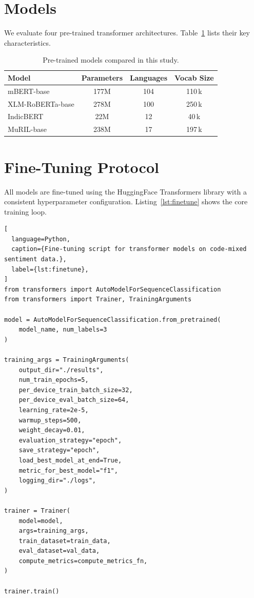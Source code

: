 \documentclass[12pt,a4paper]{report}
\begin{document}
\section{Models}

We evaluate four pre-trained transformer architectures. Table~\ref{tab:models} lists their key characteristics.

\begin{table}[htbp]
\centering
\caption{Pre-trained models compared in this study.}
\label{tab:models}
\begin{tabular}{@{}lccc@{}}
\toprule
\textbf{Model}    & \textbf{Parameters} & \textbf{Languages} & \textbf{Vocab Size} \\
\midrule
mBERT-base        & 177M & 104 & 110\,k \\
XLM-RoBERTa-base  & 278M & 100 & 250\,k \\
IndicBERT         &  22M &  12 &  40\,k \\
MuRIL-base        & 238M &  17 & 197\,k \\
\bottomrule
\end{tabular}
\end{table}

\section{Fine-Tuning Protocol}

All models are fine-tuned using the HuggingFace Transformers library with a consistent hyperparameter configuration. Listing~\ref{lst:finetune} shows the core training loop.

\begin{lstlisting}[
  language=Python,
  caption={Fine-tuning script for transformer models on code-mixed sentiment data.},
  label={lst:finetune},
]
from transformers import AutoModelForSequenceClassification
from transformers import Trainer, TrainingArguments

model = AutoModelForSequenceClassification.from_pretrained(
    model_name, num_labels=3
)

training_args = TrainingArguments(
    output_dir="./results",
    num_train_epochs=5,
    per_device_train_batch_size=32,
    per_device_eval_batch_size=64,
    learning_rate=2e-5,
    warmup_steps=500,
    weight_decay=0.01,
    evaluation_strategy="epoch",
    save_strategy="epoch",
    load_best_model_at_end=True,
    metric_for_best_model="f1",
    logging_dir="./logs",
)

trainer = Trainer(
    model=model,
    args=training_args,
    train_dataset=train_data,
    eval_dataset=val_data,
    compute_metrics=compute_metrics_fn,
)

trainer.train()
\end{lstlisting}
\end{document}
